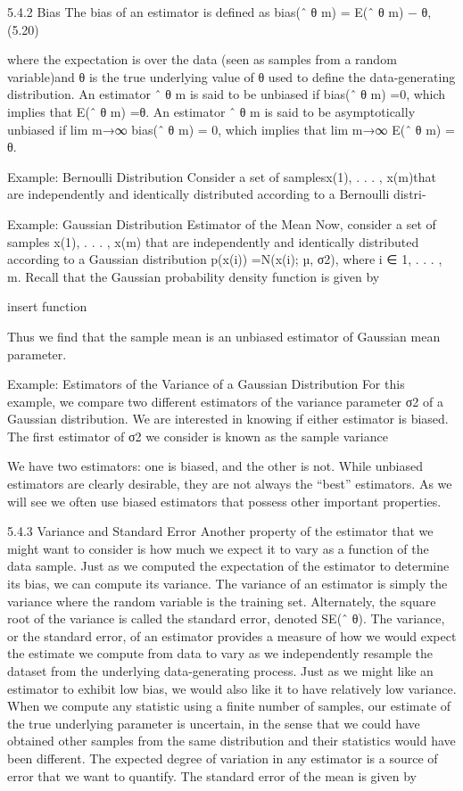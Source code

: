 \documentclass[11pt]{article}
\begin{document}
5.4.2 Bias
The bias of an estimator is deﬁned as bias(ˆ θ m) = E(ˆ θ m) − θ, (5.20)

where the expectation is over the data (seen as samples from a random variable)and θ is the true underlying value of θ used to deﬁne the data-generating distribution.
An estimator ˆ θ m is said to be unbiased if bias(ˆ θ m) =0, which implies that E(ˆ θ m) =θ.
An estimator ˆ θ m is said to be asymptotically unbiased if lim m→∞ bias(ˆ θ m) = 0, which implies that lim m→∞ E(ˆ θ m) = θ.

Example: Bernoulli Distribution
Consider a set of samples{x(1), . . . , x(m)}that are independently and identically distributed according to a Bernoulli distri-

Example: Gaussian Distribution Estimator of the Mean
Now, consider a set of samples {x(1), . . . , x(m)} that are independently and identically distributed according to a Gaussian distribution p(x(i)) =N(x(i); µ, σ2), where i ∈ {1, . . . , m}.
Recall that the Gaussian probability density function is given by

    insert function

Thus we ﬁnd that the sample mean is an unbiased estimator of Gaussian mean parameter.

Example: Estimators of the Variance of a Gaussian Distribution
For this example, we compare two diﬀerent estimators of the variance parameter σ2 of a Gaussian distribution.
We are interested in knowing if either estimator is biased.
The ﬁrst estimator of σ2 we consider is known as the sample variance

We have two estimators: one is biased, and the other is not.
While unbiased estimators are clearly desirable, they are not always the “best” estimators.
As we will see we often use biased estimators that possess other important properties.

5.4.3 Variance and Standard Error
Another property of the estimator that we might want to consider is how much we expect it to vary as a function of the data sample.
Just as we computed the expectation of the estimator to determine its bias, we can compute its variance.
The variance of an estimator is simply the variance where the random variable is the training set.
Alternately, the square root of the variance is called the standard error, denoted SE(ˆ θ).
The variance, or the standard error, of an estimator provides a measure of how
we would expect the estimate we compute from data to vary as we independently
resample the dataset from the underlying data-generating process.
Just as we might like an estimator to exhibit low bias, we would also like it to have relatively low variance.
When we compute any statistic using a ﬁnite number of samples, our estimate
of the true underlying parameter is uncertain, in the sense that we could have
obtained other samples from the same distribution and their statistics would have
been diﬀerent.
The expected degree of variation in any estimator is a source of error that we want to quantify.
The standard error of the mean is given by
\end{document}
